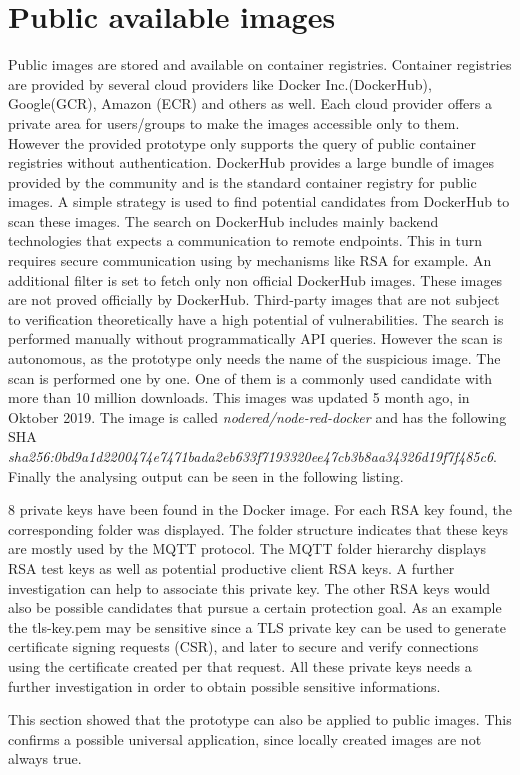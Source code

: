 \section{Public available images}
\label{ch:eval:public_images}
Public images are stored and available on container registries. Container registries are provided by several cloud providers like Docker Inc.(DockerHub), Google(GCR), Amazon (ECR) and others as well.   
Each cloud provider offers a private area for users/groups to make the images accessible only to them. However the provided prototype only supports the query of public container registries without authentication.
DockerHub provides a large bundle of images provided by the community and is the standard container registry for public images. A simple strategy is used to find potential candidates from DockerHub to scan these images.
The search on DockerHub includes mainly backend technologies that expects a communication to remote endpoints. This in turn requires secure communication using by mechanisms like RSA for example.	
An additional filter is set to fetch only non official DockerHub images. These images are not proved officially by DockerHub. Third-party images that are not subject to verification theoretically have a high potential of vulnerabilities.
The search is performed manually without programmatically API queries. However the scan is autonomous, as the prototype only needs the name of the suspicious image.
The scan is performed one by one. One of them is a commonly used candidate with more than 10 million downloads. This images was updated 5 month ago, in Oktober 2019. 
The image is called \textit{nodered/node-red-docker} and has the following SHA \textit{sha256:0bd9a1d2200474e7471bada2eb633f7193320ee47cb3b8aa34326d19f7f485c6}.
Finally the analysing output can be seen in the following listing.

8 private keys have been found in the Docker image. For each RSA key found, the corresponding folder was displayed. The folder structure indicates that these keys are mostly used by the MQTT protocol.
The MQTT folder hierarchy displays RSA test keys as well as potential productive client RSA keys. A further investigation can help to associate this private key.
The other RSA keys would also be possible candidates that pursue a certain protection goal. As an example the tls-key.pem may be sensitive since a TLS private key can be used to generate certificate signing requests (CSR), and later to secure and verify connections using the certificate created per that request. All these private keys needs a further investigation in order to obtain possible sensitive informations.

This section showed that the prototype can also be applied to public images. This confirms a possible universal application, since locally created images are not always true.
